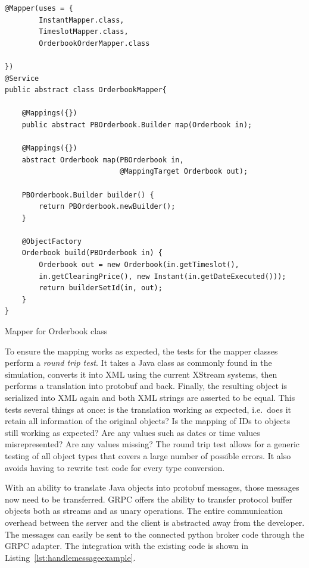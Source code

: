 \begin{listing}[ht]
    \begin{verbatim}
@Mapper(uses = {
        InstantMapper.class,
        TimeslotMapper.class,
        OrderbookOrderMapper.class

})
@Service
public abstract class OrderbookMapper{

    @Mappings({})
    public abstract PBOrderbook.Builder map(Orderbook in);

    @Mappings({})
    abstract Orderbook map(PBOrderbook in,
                           @MappingTarget Orderbook out);

    PBOrderbook.Builder builder() {
        return PBOrderbook.newBuilder();
    }

    @ObjectFactory
    Orderbook build(PBOrderbook in) {
        Orderbook out = new Orderbook(in.getTimeslot(),
        in.getClearingPrice(), new Instant(in.getDateExecuted()));
        return builderSetId(in, out);
    }
}
    \end{verbatim}
    \caption{Mapper for Orderbook class}
    \label{lst:mapperexample}
\end{listing}

To ensure the mapping works as expected, the tests for the mapper classes perform a \emph{round trip test}. It takes a
Java class as commonly found in the simulation, converts it into \ac{XML} using the current XStream systems, then
performs a translation into protobuf  and back. Finally, the resulting object is serialized into \ac{XML} again and
both \ac{XML} strings are asserted to be equal. This tests several things at once: is the translation
working as expected, i.e.\ does it retain all information of the original objects? Is the mapping of IDs to objects
still working as expected? Are any values such as dates or time values misrepresented? Are any values missing? The round
trip test allows for a generic testing of all object types that covers a large number of possible errors. It also avoids
having to rewrite test code for every type conversion.

With an ability to translate Java objects into protobuf messages, those messages now need to be transferred. \ac{GRPC}
offers the ability to transfer protocol buffer objects both as streams and as unary operations. The entire communication
overhead between the server and the client is abstracted away from the developer. The messages can easily be
sent to the connected python broker code through the \ac{GRPC} adapter. The integration with the existing code is shown
in Listing~\ref{lst:handlemessageexample}.


